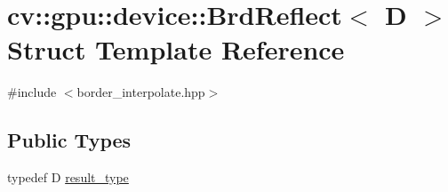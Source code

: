 \hypertarget{structcv_1_1gpu_1_1device_1_1BrdReflect}{\section{cv\-:\-:gpu\-:\-:device\-:\-:Brd\-Reflect$<$ D $>$ Struct Template Reference}
\label{structcv_1_1gpu_1_1device_1_1BrdReflect}
}


{\ttfamily \#include $<$border\-\_\-interpolate.\-hpp$>$}

\subsection*{Public Types}
\begin{DoxyCompactItemize}
\item 
typedef D \hyperlink{structcv_1_1gpu_1_1device_1_1BrdReflect_afd6b976094e7137663c20b24ee6169cb}{result\-\_\-type}
\end{DoxyCompactItemize}
